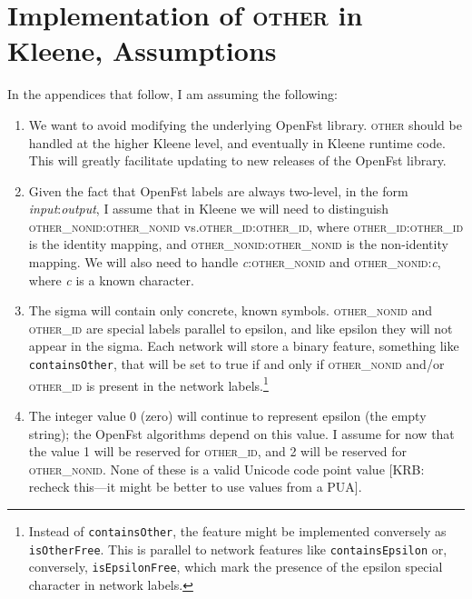 \documentclass[letterpaper,11pt]{article}
\providecommand{\acro}{}\renewcommand{\acro}{\textsc}
\begin{document}
\newpage
\appendix

\section{Implementation of \acro{other} in Kleene, Assumptions}

In the appendices that follow, I am assuming the following:

\begin{enumerate}

\item
We want to avoid modifying the underlying OpenFst library.
\acro{other} should be handled at the higher Kleene level, and eventually
in Kleene runtime code.  This will greatly facilitate updating to new releases of the OpenFst
library.

\item
Given the fact that OpenFst labels are always two-level, in the form
\emph{input}:\emph{output}, I assume that in Kleene we will need to
distinguish \acro{other\_nonid}:\acro{other\_nonid} vs.\@ \acro{other\_id}:\acro{other\_id},
where \acro{other\_id}:\acro{other\_id} is the identity mapping, and
\acro{other\_nonid}:\acro{other\_nonid} is the non-identity mapping.  We will
also need to handle \emph{c}:\acro{other\_nonid} and \acro{other\_nonid}:\emph{c}, where
\emph{c} is a known character.

\item
The sigma will contain only concrete, known symbols.  \acro{other\_nonid} and \acro{other\_id}
are special labels parallel to epsilon, and like epsilon they will not appear in the sigma.
Each network will store a binary feature, something like \texttt{containsOther}, that will be set to
true if and only if \acro{other\_nonid} and/or \acro{other\_id} is present in the network
labels.\footnote{Instead of \texttt{containsOther}, the feature might be implemented
conversely as \texttt{isOtherFree}.  This is parallel to network features like
\texttt{containsEpsilon} or, conversely,
\texttt{isEpsilonFree}, which mark the presence of the epsilon special character in network labels.}

\item
The integer value 0 (zero) will continue to represent epsilon (the
empty string); the OpenFst algorithms depend on this value.
I assume for now that the value 1 will be reserved for \acro{other\_id}, and
2 will be reserved for \acro{other\_nonid}.  None of these is a valid Unicode
code point value [KRB: recheck this---it might be better to use values from a PUA].


\end{enumerate}
\end{document}
